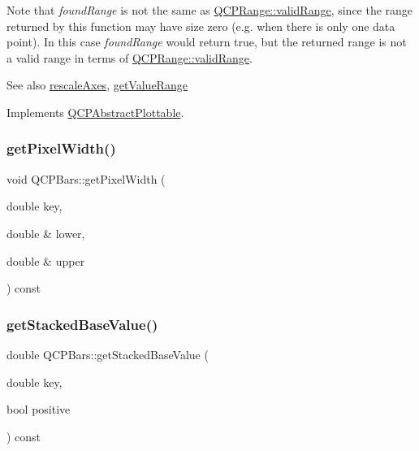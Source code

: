 Note that {\itshape found\+Range} is not the same as \hyperlink{class_q_c_p_range_ab38bd4841c77c7bb86c9eea0f142dcc0}{Q\+C\+P\+Range\+::valid\+Range}, since the range returned by this function may have size zero (e.\+g. when there is only one data point). In this case {\itshape found\+Range} would return true, but the returned range is not a valid range in terms of \hyperlink{class_q_c_p_range_ab38bd4841c77c7bb86c9eea0f142dcc0}{Q\+C\+P\+Range\+::valid\+Range}.

\begin{DoxySeeAlso}{See also}
\hyperlink{class_q_c_p_abstract_plottable_a1491c4a606bccd2d09e65e11b79eb882}{rescale\+Axes}, \hyperlink{class_q_c_p_bars_a02cee4bf94d48a1e5f6fc185d9a10477}{get\+Value\+Range} 
\end{DoxySeeAlso}


Implements \hyperlink{class_q_c_p_abstract_plottable_a4da16d3cd4b509e1104a9b0275623c96}{Q\+C\+P\+Abstract\+Plottable}.

\mbox{\label{class_q_c_p_bars_ad87586cc5e9806740bc0e867667da409}} 
\subsubsection{\texorpdfstring{get\+Pixel\+Width()}{getPixelWidth()}}
{\footnotesize\ttfamily void Q\+C\+P\+Bars\+::get\+Pixel\+Width (\begin{DoxyParamCaption}\item[{double}]{key,  }\item[{double \&}]{lower,  }\item[{double \&}]{upper }\end{DoxyParamCaption}) const\hspace{0.3cm}{\ttfamily [protected]}}

\mbox{\label{class_q_c_p_bars_a0ffd6e043876e13e89eaa54e9f8a04b9}} 
\subsubsection{\texorpdfstring{get\+Stacked\+Base\+Value()}{getStackedBaseValue()}}
{\footnotesize\ttfamily double Q\+C\+P\+Bars\+::get\+Stacked\+Base\+Value (\begin{DoxyParamCaption}\item[{double}]{key,  }\item[{bool}]{positive }\end{DoxyParamCaption}) const\hspace{0.3cm}{\ttfamily [protected]}}

